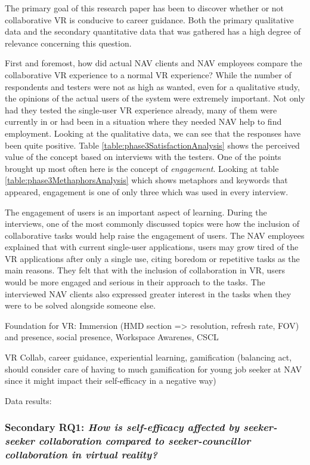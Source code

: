 The primary goal of this research paper has been to discover whether or not collaborative VR is conducive to career guidance. Both the primary qualitative data and the secondary quantitative data that was gathered has a high degree of relevance concerning this question. 

First and foremost, how did actual NAV clients and NAV employees compare the collaborative VR experience to a normal VR experience? While the number of respondents and testers were not as high as wanted, even for a qualitative study, the opinions of the actual users of the system were extremely important. Not only had they tested the single-user VR experience already, many of them were currently in or had been in  a situation where they needed NAV help to find employment. Looking at the qualitative data, we can see that the responses have been quite positive. Table \ref{table:phase3SatisfactionAnalysis} shows the perceived value of the concept based on interviews with the testers. One of the points brought up most often here is the concept of \textit{engagement}. Looking at table \ref{table:phase3MethaphorsAnalysis} which shows metaphors and keywords that appeared, engagement is one of only three which was used in every interview. 

The engagement of users is an important aspect of learning. During the interviews, one of the most commonly discussed topics were how the inclusion of collaborative tasks would help raise the engagement of users. The NAV employees explained that with current single-user applications, users may grow tired of the VR applications after only a single use, citing boredom or repetitive tasks as the main reasons. They felt that with the inclusion of collaboration in VR, users would be more engaged and serious in their approach to the tasks. The interviewed NAV clients also expressed greater interest in the tasks when they were to be solved alongside someone else. 

Foundation for VR: Immersion (HMD section => resolution, refresh rate, FOV) and presence, social presence, Workspace Awarenes, CSCL

VR Collab, career guidance, experiential learning, gamification (balancing act, should consider care of having to much gamification for young job seeker at NAV since it might impact their self-efficacy in a negative way) 

Data results: 


\subsubsection{Secondary RQ1: \textit{How is self-efficacy affected by seeker-seeker collaboration compared to seeker-councillor collaboration in virtual reality?}} 

